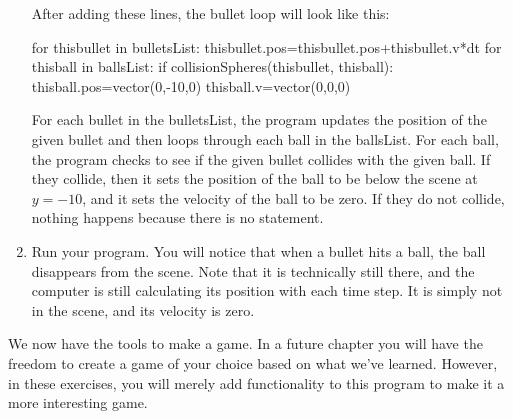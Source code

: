 \begin{enumerate}
After adding these lines, the bullet  loop will look like this:

\begin{myvpython}
    for thisbullet in bulletsList:
        thisbullet.pos=thisbullet.pos+thisbullet.v*dt
        for thisball in ballsList:
            if collisionSpheres(thisbullet, thisball):
                thisball.pos=vector(0,-10,0)
                thisball.v=vector(0,0,0)
\end{myvpython}

For each bullet in the bulletsList, the program updates the position of the given bullet and then loops through each ball in the ballsList. For each ball, the program checks to see if the given bullet collides with the given ball. If they collide, then it sets the position of the ball to be below the scene at $y=-10$, and it sets the velocity of the ball to be zero. If they do not collide, nothing happens because there is no  statement.

\item Run your program. You will notice that when a bullet hits a ball, the ball disappears from the scene. Note that it is technically still there, and the computer is still calculating its position with each time step. It is simply not in the scene, and its velocity is zero.

\end{enumerate}

\pagebreak

\analysis

We now have the tools to make a game. In a future chapter you will have the freedom to create a game of your choice based on what we've learned. However, in these exercises, you will merely add functionality to this program to make it a more interesting game.

